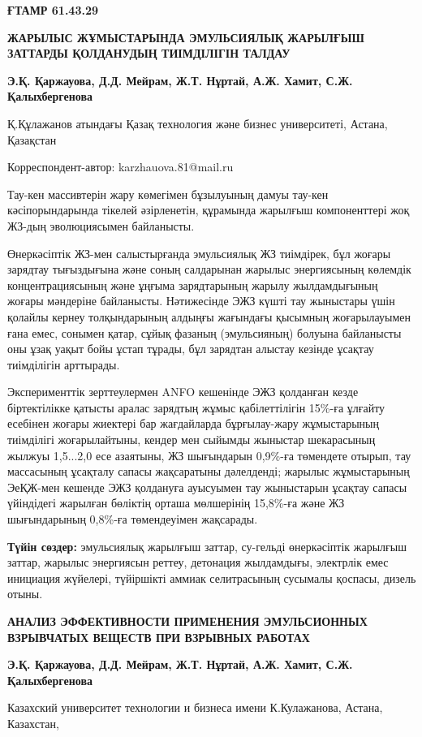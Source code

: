 \newpage
{\bfseries ҒТАМР 61.43.29}

{\bfseries ЖАРЫЛЫС ЖҰМЫСТАРЫНДА ЭМУЛЬСИЯЛЫҚ ЖАРЫЛҒЫШ ЗАТТАРДЫ ҚОЛДАНУДЫҢ
ТИІМДІЛІГІН ТАЛДАУ}

{\bfseries Э.Қ. Қаржауова, Д.Д. Мейрам, Ж.Т. Нұртай, А.Ж. Хамит, С.Ж.
Қалыхбергенова}

Қ.Құлажанов атындағы Қазақ технология және бизнес университеті, Астана,
Қазақстан

Корреспондент-автор: karzhauova.81@mail.ru

Тау-кен массивтерін жару көмегімен бұзылуының дамуы тау-кен
кәсіпорындарында тікелей әзірленетін, құрамында жарылғыш компоненттері
жоқ ЖЗ-дың эволюциясымен байланысты.

Өнеркәсіптік ЖЗ-мен салыстырғанда эмульсиялық ЖЗ тиімдірек, бұл жоғары
зарядтау тығыздығына және соның салдарынан жарылыс энергиясының көлемдік
концентрациясының және ұңғыма зарядтарының жарылу жылдамдығының жоғары
мәндеріне байланысты. Нәтижесінде ЭЖЗ күшті тау жыныстары үшін қолайлы
кернеу толқындарының алдыңғы жағындағы қысымның жоғарылауымен ғана емес,
сонымен қатар, сұйық фазаның (эмульсияның) болуына байланысты оны ұзақ
уақыт бойы ұстап тұрады, бұл зарядтан алыстау кезінде ұсақтау
тиімділігін арттырады.

Эксперименттік зерттеулермен ANFO кешенінде ЭЖЗ қолданған кезде
біртектілікке қатысты аралас зарядтың жұмыс қабілеттілігін 15\%-ға
ұлғайту есебінен жоғары жиектері бар жағдайларда бұрғылау-жару
жұмыстарының тиімділігі жоғарылайтыны, кендер мен сыйымды жыныстар
шекарасының жылжуы 1,5...2,0 есе азаятыны, ЖЗ шығындарын 0,9\%-ға
төмендете отырып, тау массасының ұсақталу сапасы жақсаратыны дәлелденді;
жарылыс жұмыстарының ЭеҚЖ-мен кешенде ЭЖЗ қолдануға ауысуымен тау
жыныстарын ұсақтау сапасы үйіндідегі жарылған бөліктің орташа мөлшерінің
15,8\%-ға және ЖЗ шығындарының 0,8\%-ға төмендеуімен жақсарады.

{\bfseries Түйін сөздер:} эмульсиялық жарылғыш заттар, су-гельді
өнеркәсіптік жарылғыш заттар, жарылыс энергиясын реттеу, детонация
жылдамдығы, электрлік емес инициация жүйелері, түйіршікті аммиак
селитрасының сусымалы қоспасы, дизель отыны.

{\bfseries АНАЛИЗ ЭФФЕКТИВНОСТИ ПРИМЕНЕНИЯ ЭМУЛЬСИОННЫХ ВЗРЫВЧАТЫХ ВЕЩЕСТВ
ПРИ ВЗРЫВНЫХ РАБОТАХ}

{\bfseries Э.Қ. Қаржауова, Д.Д. Мейрам, Ж.Т. Нұртай, А.Ж. Хамит, С.Ж.
Қалыхбергенова}

Казахский университет технологии и бизнеса имени К.Кулажанова, Астана,
Казахстан,

